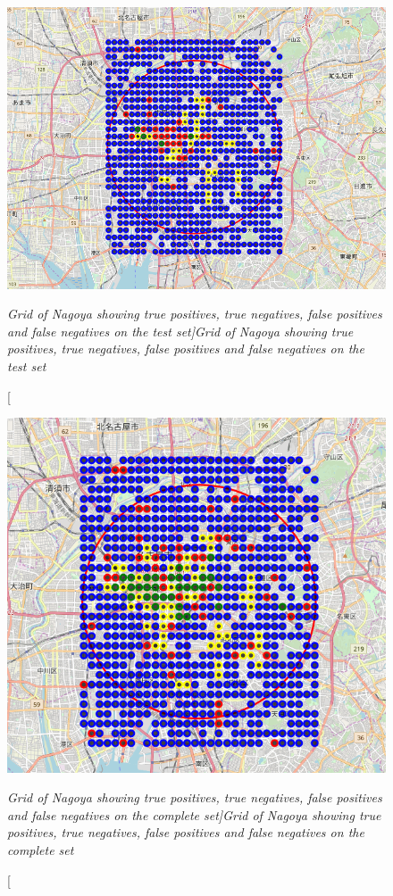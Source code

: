 \documentclass[12pt,a4paper]{article}
\begin{document}
\begin{figure}[ht]
	\begin{center}
			  \includegraphics[width=15cm]{model_result_map_test.png}
	\end{center}
	\caption [\itshape Grid of Nagoya showing true positives, true negatives, false positives and false negatives on the test set]{\itshape Grid of Nagoya showing true positives, true negatives, false positives and false negatives on the test set}	
	\label{map_test}
\end{figure}

\begin{figure}[ht]
	\begin{center}
			  \includegraphics[width=15cm]{model_result_map_complete.png}
	\end{center}
	\caption [\itshape Grid of Nagoya showing true positives, true negatives, false positives and false negatives on the complete set]{\itshape Grid of Nagoya showing true positives, true negatives, false positives and false negatives on the complete set}	
	\label{map_complete}
\end{figure}
\end{document}
